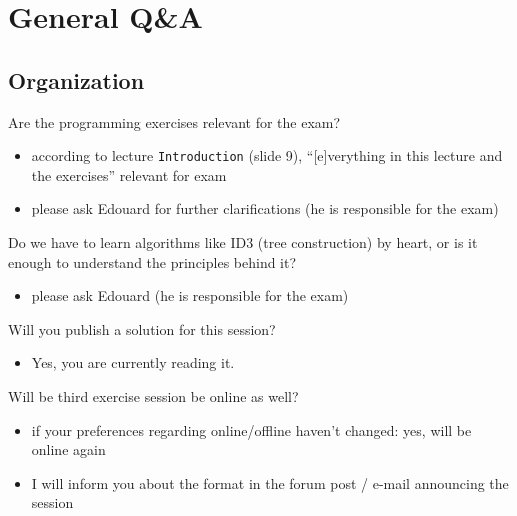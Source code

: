 \documentclass[12pt]{article}
\newcommand{\code}[1]{\textcolor{kitgreen}{\texttt{#1}}}
\begin{document}
\section*{General Q\&A}

\subsection*{Organization}

\begin{question}
	Are the programming exercises relevant for the exam?
\end{question}

\begin{itemize}[left=0pt, nosep]
	\item according to lecture \code{Introduction} (slide 9), ``[e]verything in this lecture and the exercises'' relevant for exam
	\item please ask Edouard for further clarifications (he is responsible for the exam)
\end{itemize}

\begin{question}
	Do we have to learn algorithms like ID3 (tree construction) by heart, or is it enough to understand the principles behind it?
\end{question}

\begin{itemize}[left=0pt, nosep]
	\item please ask Edouard (he is responsible for the exam)
\end{itemize}

\begin{question}
	Will you publish a solution for this session?
\end{question}

\begin{itemize}[left=0pt, nosep]
	\item Yes, you are currently reading it.
\end{itemize}

\begin{question}
	Will be third exercise session be online as well?
\end{question}

\begin{itemize}[left=0pt, nosep]
	\item if your preferences regarding online/offline haven't changed: yes, will be online again
	\item I will inform you about the format in the forum post / e-mail announcing the session
\end{itemize}
\end{document}
